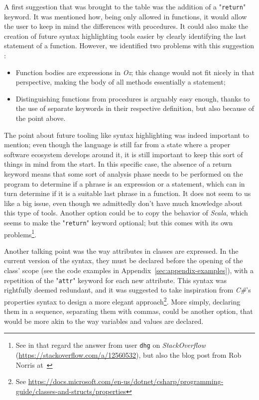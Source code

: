 A first suggestion that was brought to the table was the addition of a "\texttt{return}" keyword.
It was mentioned how, being only allowed in functions, it would allow the user to keep in mind the differences with procedures.
It could also make the creation of future syntax highlighting tools easier by clearly identifying the last statement of a function.
However, we identified two problems with this suggestion :
\begin{itemize}
    \item Function bodies are expressions in \textit{Oz}; this change would not fit nicely in that perspective, making the body of all methods essentially a statement;
    \item Distinguishing functions from procedures is arguably easy enough, thanks to the use of separate keywords in their respective definition, but also because of the point above.
\end{itemize}
The point about future tooling like syntax highlighting was indeed important to mention;
even though the language is still far from a state where a proper software ecosystem develops around it, it is still important to keep this sort of things in mind from the start.
In this specific case, the absence of a return keyword means that some sort of analysis phase needs to be performed on the program to determine if a phrase is an expression or a statement, which can in turn determine if it is a suitable last phrase in a function.
It does not seem to us like a big issue, even though we admittedly don't have much knowledge about this type of tools.
Another option could be to copy the behavior of \textit{Scala}, which seems to make the "\texttt{return}" keyword optional;
but this comes with its own problems\footnote{See in that regard the answer from user \texttt{dhg} on \textit{StackOverflow} (\url{https://stackoverflow.com/a/12560532}), but also the blog post from Rob Norris at~\cite{returnscala}}.\newline

Another talking point was the way attributes in classes are expressed.
In the current version of the syntax, they must be declared before the opening of the class' scope (see the code examples in Appendix~\ref{sec:appendix-examples}), with a repetition of the "\texttt{attr}" keyword for each new attribute.
This syntax was rightfully deemed redundant, and it was suggested to take inspiration from \textit{C\#}'s properties syntax to design a more elegant approach\footnote{See \url{https://docs.microsoft.com/en-us/dotnet/csharp/programming-guide/classes-and-structs/properties}}.
More simply, declaring them in a sequence, separating them with commas, could be another option, that would be more akin to the way variables and values are declared.\newline

